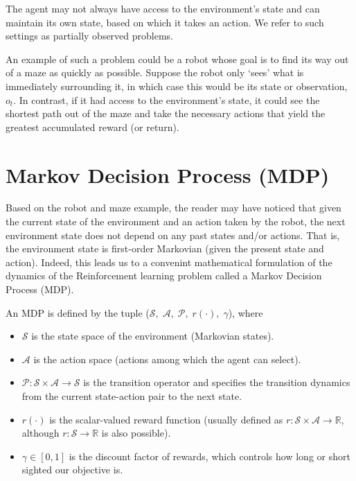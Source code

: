 \documentclass{report}
\newcommand{\reals}{\mbox{\(\mathbb R\)}}
\numberwithin{equation}{section}
\numberwithin{figure}{section}
\numberwithin{table}{section}
\begin{document}
The agent may not always have access 
to the environment's state and can maintain its own state, based 
on which it takes an action. We refer to such settings as partially 
observed problems. 

An example of such a problem could be a robot 
whose goal is to find its way out of a maze as quickly as possible.
Suppose the robot only `sees' what is 
immediately surrounding it, in which case this would be its state 
or observation, $o_t$. 
In contrast, if it had access to the environment's state, it could 
see the shortest path out of the maze and take the necessary actions 
that yield the greatest accumulated reward (or return).

\section{Markov Decision Process (MDP)}
\label{sec:RLMDP}
Based on the robot and maze example, the reader may have noticed 
that given the current state of the environment and an action taken 
by the robot, the next environment state does not depend on any 
past states and/or actions. That is, the environment state 
is first-order Markovian (given the present state and action). Indeed, this leads us to a convenint 
mathematical formulation of the dynamics of the 
Reinforcement learning problem called 
a Markov Decision Process (MDP).

An MDP is defined by the tuple 
($\mathcal{S},\; \mathcal{A},\; \mathcal{P},\; r(\cdot),\; \gamma$), where
\begin{itemize}
  \item $\mathcal{S}$ is the state space of the environment 
    (Markovian states).
  \item $\mathcal{A}$ is the action space (actions among which 
    the agent can select).
  \item $\mathcal{P}:\mathcal{S}\times \mathcal{A}\rightarrow\mathcal{S}$ 
    is the transition operator and specifies the transition 
    dynamics from 
    the current state-action pair to the next state.
  \item $r(\cdot)$ is the scalar-valued reward function 
    (usually defined as $r:\mathcal{S}\times \mathcal{A}\rightarrow \reals$, 
    although $r:\mathcal{S}\rightarrow \reals$ is also possible).
  \item $\gamma\in [0, 1]$ is the discount factor of rewards, which controls 
    how long or short sighted our objective is.
\end{itemize} 
\end{document}
